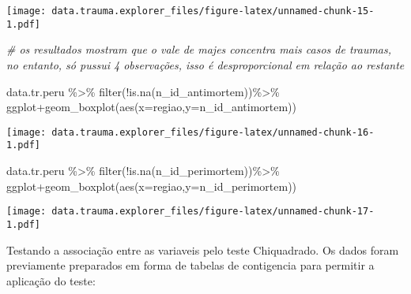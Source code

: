 \documentclass[
]{article}
\newenvironment{Shaded}{\begin{snugshade}}{\end{snugshade}}
\newcommand{\AttributeTok}[1]{\textcolor[rgb]{0.77,0.63,0.00}{#1}}
\newcommand{\CommentTok}[1]{\textcolor[rgb]{0.56,0.35,0.01}{\textit{#1}}}
\newcommand{\FunctionTok}[1]{\textcolor[rgb]{0.00,0.00,0.00}{#1}}
\newcommand{\NormalTok}[1]{#1}
\newcommand{\SpecialCharTok}[1]{\textcolor[rgb]{0.00,0.00,0.00}{#1}}
\begin{document}
\texttt{[image: data.trauma.explorer\_files/figure-latex/unnamed-chunk-15-1.pdf]}

\begin{Shaded}
\begin{Highlighting}[]
\CommentTok{\# os resultados mostram que o vale de majes concentra mais casos de traumas, no entanto, só pussui 4 observações, isso é desproporcional em relação ao restante}
\end{Highlighting}
\end{Shaded}

\begin{Shaded}
\begin{Highlighting}[]
\NormalTok{data.tr.peru }\SpecialCharTok{\%\textgreater{}\%} \FunctionTok{filter}\NormalTok{(}\SpecialCharTok{!}\FunctionTok{is.na}\NormalTok{(n\_id\_antimortem))}\SpecialCharTok{\%\textgreater{}\%}\NormalTok{ ggplot}\SpecialCharTok{+}\FunctionTok{geom\_boxplot}\NormalTok{(}\FunctionTok{aes}\NormalTok{(}\AttributeTok{x=}\NormalTok{regiao,}\AttributeTok{y=}\NormalTok{n\_id\_antimortem))}
\end{Highlighting}
\end{Shaded}

\texttt{[image: data.trauma.explorer\_files/figure-latex/unnamed-chunk-16-1.pdf]}

\begin{Shaded}
\begin{Highlighting}[]
\NormalTok{data.tr.peru }\SpecialCharTok{\%\textgreater{}\%} \FunctionTok{filter}\NormalTok{(}\SpecialCharTok{!}\FunctionTok{is.na}\NormalTok{(n\_id\_perimortem))}\SpecialCharTok{\%\textgreater{}\%}\NormalTok{ ggplot}\SpecialCharTok{+}\FunctionTok{geom\_boxplot}\NormalTok{(}\FunctionTok{aes}\NormalTok{(}\AttributeTok{x=}\NormalTok{regiao,}\AttributeTok{y=}\NormalTok{n\_id\_perimortem))}
\end{Highlighting}
\end{Shaded}

\texttt{[image: data.trauma.explorer\_files/figure-latex/unnamed-chunk-17-1.pdf]}

Testando a associação entre as variaveis pelo teste Chiquadrado. Os
dados foram previamente preparados em forma de tabelas de contigencia
para permitir a aplicação do teste:
\end{document}
